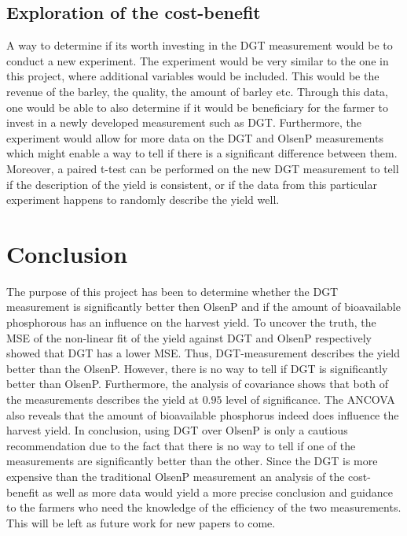 \documentclass[11pt, fleqn, titlepage]{article}
\begin{document}
\subsection*{Exploration of the cost-benefit }
A way to determine if its worth investing in the DGT measurement would be to conduct a new experiment. The experiment would be very similar to the one in this project, where additional variables would be included. This would be the revenue of the barley, the quality, the amount of barley etc. Through this data, one would be able to also determine if it would be beneficiary for the farmer to invest in a newly developed measurement such as DGT. Furthermore, the experiment would allow for more data on the DGT and OlsenP measurements which might enable a way to tell if there is a significant difference between them. Moreover, a paired t-test can be performed on the new DGT measurement to tell if the description of the yield is consistent, or if the data from this particular experiment happens to randomly describe the yield well. 


\section{Conclusion}

The purpose of this project has been to determine whether the DGT measurement is significantly better then OlsenP and if the amount of bioavailable phosphorous has an influence on the harvest yield. To uncover the truth, the MSE of the non-linear fit of the yield against DGT and OlsenP respectively showed that DGT has a lower MSE. Thus, DGT-measurement describes the yield better than the OlsenP. However, there is no way to tell if DGT is significantly better than OlsenP. Furthermore, the analysis of covariance shows that both of the measurements describes the yield at $ 0.95 $ level of significance. The ANCOVA also reveals that the amount of bioavailable phosphorus indeed does influence the harvest yield. In conclusion, using DGT over OlsenP is only a cautious recommendation due to the fact that there is no way to tell if one of the measurements are significantly better than the other. Since the DGT is more expensive than the traditional OlsenP measurement an analysis of the cost-benefit as well as more data would yield a more precise conclusion and guidance to the farmers who need the knowledge of the efficiency of the two measurements. This will be left as future work for new papers to come.

\newpage



\end{document}
